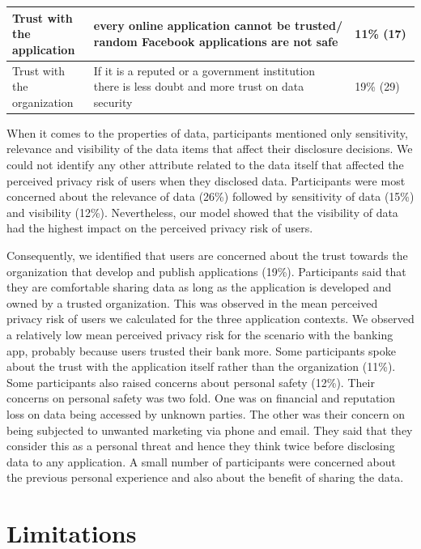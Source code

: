 \documentclass[conference]{IEEEtran}
\begin{document}
\begin{center}
\begin{table}[htbp]
\begin{center}
\begin{adjustbox}{width=1\textwidth}
\begin{tabular}{|p{0.20\linewidth}|p{0.64\linewidth}|p{0.16\linewidth}|}
\hline
Trust with the application & every online application cannot be trusted/ random Facebook applications are not safe & 11\% (17)\\ 
\hline
Trust with the organization & If it is a reputed or a government institution there is less doubt and more trust on data security
 & 19\% (29)\\ 
\hline
\end{tabular}
\end{adjustbox}
\end{center}
\end{table}
\end{center}

When it comes to the properties of data, participants mentioned only sensitivity, relevance and visibility of the data items that affect their disclosure decisions. We could not identify any other attribute related to the data itself that affected the perceived privacy risk of users when they disclosed data. Participants were most concerned about the relevance of data (26\%) followed by sensitivity of data (15\%) and visibility (12\%). Nevertheless, our model showed that the visibility of data had the highest impact on the perceived privacy risk of users.

Consequently, we identified that users are concerned about the trust towards the organization that develop and publish applications (19\%). Participants said that they are comfortable sharing data as long as the application is developed and owned by a trusted organization. This was observed in the mean perceived privacy risk of users we calculated for the three application contexts. We observed a relatively low mean perceived privacy risk for the scenario with the banking app, probably because users trusted their bank more. Some participants spoke about the trust with the application itself rather than the organization (11\%). Some participants also raised concerns about personal safety (12\%). Their concerns on personal safety was two fold. One was on financial and reputation loss on data being accessed by unknown parties. The other was their concern on being subjected to unwanted marketing via phone and email. They said that they consider this as a personal threat and hence they think twice before disclosing data to any application. A small number of participants were concerned about the previous personal experience and also about the benefit of sharing the data. 

\section {Limitations}
\end{document}
